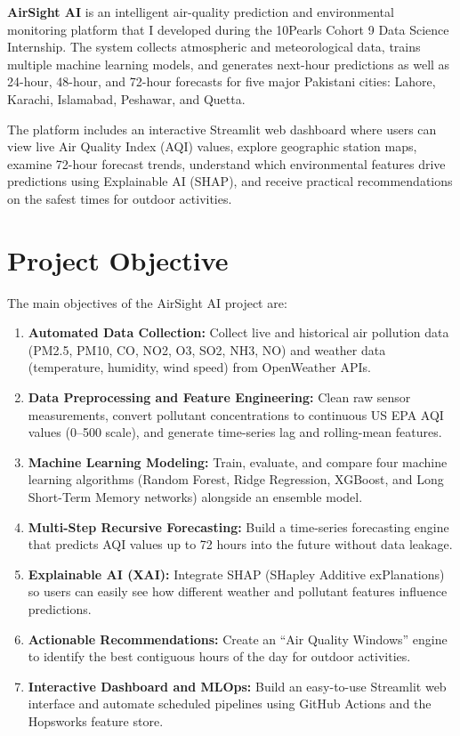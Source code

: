 \documentclass[12pt,a4paper]{article}
\begin{document}
\textbf{AirSight AI} is an intelligent air-quality prediction and environmental monitoring platform that I developed during the 10Pearls Cohort 9 Data Science Internship. The system collects atmospheric and meteorological data, trains multiple machine learning models, and generates next-hour predictions as well as 24-hour, 48-hour, and 72-hour forecasts for five major Pakistani cities: Lahore, Karachi, Islamabad, Peshawar, and Quetta.

The platform includes an interactive Streamlit web dashboard where users can view live Air Quality Index (AQI) values, explore geographic station maps, examine 72-hour forecast trends, understand which environmental features drive predictions using Explainable AI (SHAP), and receive practical recommendations on the safest times for outdoor activities.

\section{Project Objective}

The main objectives of the AirSight AI project are:
\begin{enumerate}
    \item \textbf{Automated Data Collection:} Collect live and historical air pollution data (PM2.5, PM10, CO, NO2, O3, SO2, NH3, NO) and weather data (temperature, humidity, wind speed) from OpenWeather APIs.
    \item \textbf{Data Preprocessing and Feature Engineering:} Clean raw sensor measurements, convert pollutant concentrations to continuous US EPA AQI values (0--500 scale), and generate time-series lag and rolling-mean features.
    \item \textbf{Machine Learning Modeling:} Train, evaluate, and compare four machine learning algorithms (Random Forest, Ridge Regression, XGBoost, and Long Short-Term Memory networks) alongside an ensemble model.
    \item \textbf{Multi-Step Recursive Forecasting:} Build a time-series forecasting engine that predicts AQI values up to 72 hours into the future without data leakage.
    \item \textbf{Explainable AI (XAI):} Integrate SHAP (SHapley Additive exPlanations) so users can easily see how different weather and pollutant features influence predictions.
    \item \textbf{Actionable Recommendations:} Create an ``Air Quality Windows'' engine to identify the best contiguous hours of the day for outdoor activities.
    \item \textbf{Interactive Dashboard and MLOps:} Build an easy-to-use Streamlit web interface and automate scheduled pipelines using GitHub Actions and the Hopsworks feature store.
\end{enumerate}
\end{document}
